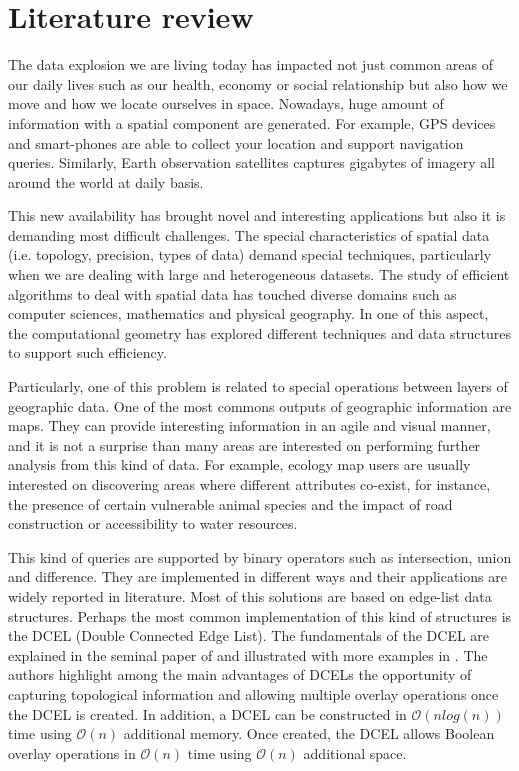 \section{Literature review}
The data explosion we are living today has impacted not just common areas of our daily lives such as our health, economy or social relationship but also how we move and how we locate ourselves in space.  Nowadays, huge amount of information with a spatial component are generated.  For example, GPS devices and smart-phones are able to collect your location and support navigation queries.  Similarly, Earth observation satellites captures gigabytes of imagery all around the world at daily basis.

This new availability has brought novel and interesting applications but also it is demanding most difficult challenges.  The special characteristics of spatial data (i.e. topology, precision, types of data) demand special techniques, particularly when we are dealing with large and heterogeneous datasets.  The study of efficient algorithms to deal with spatial data has touched diverse domains such as computer sciences, mathematics and physical geography.  In one of this aspect, the computational geometry has explored different techniques and data structures to support such efficiency.

Particularly, one of this problem is related to special operations between layers of geographic data.  One of the most commons outputs of geographic information are maps.  They can provide interesting information in an agile and visual manner, and it is not a surprise than many areas are interested on performing further analysis from this kind of data.  For example, ecology map users are usually interested on discovering areas where different attributes co-exist, for instance, the presence of certain vulnerable animal species and the impact of road construction or accessibility to water resources.  

This kind of queries are supported by binary operators such as intersection, union and difference.  They are implemented in different ways and their applications are widely reported in literature.  Most of this solutions are based on edge-list data structures.  Perhaps the most common implementation of this kind of structures is the DCEL (Double Connected Edge List).  The fundamentals of the DCEL are explained in the seminal paper of \cite{muller_finding_1978} and illustrated with more examples in \cite{preparata_computational_1985}.  The authors highlight among the main advantages of DCELs the opportunity of capturing topological information and allowing multiple overlay operations once the DCEL is created.  In addition, a DCEL can be constructed in $\mathcal{O}(n log(n))$ time using $\mathcal{O}(n)$ additional memory. Once created, the DCEL allows Boolean overlay operations in $\mathcal{O}(n)$ time using $\mathcal{O}(n)$ additional space. 

